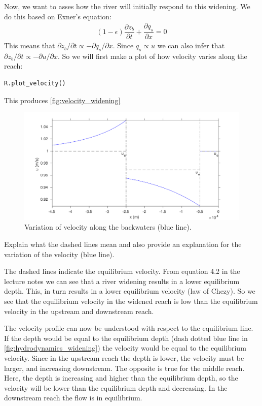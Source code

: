 \documentclass[a4paper]{article}
\newcommand{\pder}[2]{\dfrac{\partial#1}{\partial#2}}
\newcommand{\lpder}[2]{\partial#1/\partial#2}
\begin{document}
Now, we want to asses how the river will initially respond to this widening. We do this based on Exner's equation:
\begin{align*}
  (1-\epsilon)\pder{z_b}{t}+\pder{q_s}{x}=0
\end{align*}
This means that $\lpder{z_b}{t}\propto-\lpder{q_s}{x}$. Since $q_s\propto u$ we can also infer that $\lpder{z_b}{t}\propto-\lpder{u}{x}$.
So we will first make a plot of how velocity varies along the reach:
\begin{lstlisting}
R.plot_velocity()
\end{lstlisting}
This produces \autoref{fig:velocity_widening} 
\begin{figure}[ht]
  \centering
  \includegraphics[width=\linewidth]{matlab/velocity_widening.pdf}
  \caption{Variation of velocity along the backwaters (blue line).}
  \label{fig:velocity_widening}
\end{figure}
\begin{exercise}
  Explain what the dashed lines mean and also provide an explanation for the variation of the velocity (blue line).
\end{exercise}
\begin{solution}
  The dashed lines indicate the equilibrium velocity. From equation 4.2 in the lecture notes we can see that a river widening results in a lower equilibrium depth. This, in turn results in a lower equilibrium velocity (law of Chezy). So we see that the equilibrium velocity in the widened reach is low than the equilibrium velocity in the upstream and downstream reach. 

  The velocity profile can now be understood with respect to the equilibrium line. If the depth would be equal to the equilibrium depth (dash dotted blue line in \autoref{fig:hydrodynamics_widening}) the velocity would be equal to the equilibrium velocity. Since in the upstream reach the depth is lower, the velocity must be larger, and increasing downstream. The opposite is true for the middle reach. Here, the depth is increasing and higher than the equilibrium depth, so the velocity will be lower than the equilibrium depth and decreasing. In the downstream reach the flow is in equilibrium.
\end{solution}
\end{document}
